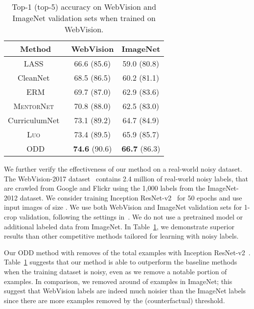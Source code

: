 \documentclass[a4paper,11pt]{article}
\begin{document}
\begin{table}
\centering
\caption{Top-1 (top-5) accuracy on WebVision and ImageNet validation sets when trained on WebVision. }
\label{tab:webvision}
    \begin{tabular}{c | c c}
    \toprule
     Method    & WebVision & ImageNet \\\midrule


        LASS~\cite{arpit2017a} & 66.6 (85.6) & 59.0 (80.8) \\
        CleanNet~\cite{lee2018cleannet}  & 68.5 (86.5) & 60.2 (81.1) \\
        \textsc{ERM} & 69.7 (87.0) & 62.9 (83.6) \\
        \textsc{MentorNet}~\cite{jiang2017mentornet} & 70.8 (88.0) & 62.5 (83.0) \\
CurriculumNet~\cite{guo2018curriculumnet} & 73.1 (89.2) & 64.7 (84.9) \\
        \textsc{Luo}~\cite{luo2019simple} & 73.4 (89.5) & 65.9 (85.7) \\
        \midrule
        \textsc{ODD} &  \textbf{74.6} (90.6) & \textbf{66.7} (86.3)  \\\bottomrule
    \end{tabular}
\end{table}

We further verify the effectiveness of our method on a real-world noisy dataset. The WebVision-2017 dataset~\cite{li2017webvision} contains 2.4 million of real-world noisy labels, that are crawled from Google and Flickr using the 1,000 labels from the ImageNet-2012 dataset. 
We consider training Inception ResNet-v2~\cite{szegedy2016inception} for 50 epochs and use input images of size . 
We use both WebVision and ImageNet validation sets for 1-crop validation, following the settings in~\cite{jiang2017mentornet}. We do not use a pretrained model or additional labeled data from ImageNet.
In Table~\ref{tab:webvision}, we demonstrate superior results than other competitive methods tailored for learning with noisy labels. 

Our \textsc{ODD} method with  removes  of the total examples with Inception ResNet-v2~\cite{szegedy2016inception}. Table~\ref{tab:webvision} suggests that our method is able to outperform the baseline methods when the training dataset is noisy, even as we remove a notable portion of examples. In comparison, we removed around  of examples in ImageNet;  this suggest that WebVision labels are indeed much noisier than the ImageNet labels since there are more examples removed by the (counterfactual) threshold. 
\end{document}

